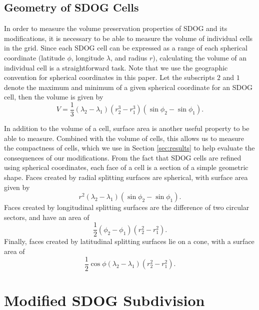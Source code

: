\subsection{Geometry of SDOG Cells} \label{sec:sdog-geometry}
In order to measure the volume preservation properties of SDOG and its modifications, it is necessary to be able to measure the volume of individual cells in the grid.
Since each SDOG cell can be expressed as a range of each spherical coordinate (latitude $\phi$, longitude $\lambda$, and radius $r$), calculating the volume of an individual cell is a straightforward task.
Note that we use the geographic convention for spherical coordinates in this paper.
Let the subscripts $2$ and $1$ denote the maximum and minimum of a given spherical coordinate for an SDOG cell, then the volume is given by \cite{yu2009sdog}
%
\begin{equation}
V = \frac{1}{3} \left( \lambda_{2} - \lambda_{1} \right) \left(r_{2}^{3} - r_{1}^{3} \right) \left(\sin\phi_{2} - \sin\phi_{1} \right).
\label{eq:volume}
\end{equation}


In addition to the volume of a cell, surface area is another useful property to be able to measure.
Combined with the volume of cells, this allows us to measure the compactness of cells, which we use in Section \ref{sec:results} to help evaluate the consequences of our modifications.
From the fact that SDOG cells are refined using spherical coordinates, each face of a cell is a section of a simple geometric shape.
Faces created by radial splitting surfaces are spherical, with surface area given by
%
\begin{equation}
r^{2} \left( \lambda_{2} - \lambda_{1} \right) \left( \sin\phi_{2} - \sin\phi_{1} \right).
\end{equation}
%
Faces created by longitudinal splitting surfaces are the difference of two circular sectors, and have an area of
\begin{equation}
\frac{1}{2} \left( \phi_{2} - \phi_{1} \right) \left( r_{2}^{2} - r_{1}^{2} \right).
\end{equation}
%
Finally, faces created by latitudinal splitting surfaces lie on a cone, with a surface area of
\begin{equation}
\frac{1}{2} \cos\phi \left( \lambda_{2} - \lambda_{1} \right) \left( r_{2}^{2} - r_{1}^{2} \right).
\end{equation}


\section{Modified SDOG Subdivision} \label{sec:method}

